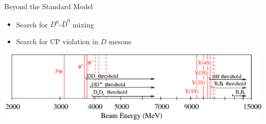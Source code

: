 \begin{slide*}
\begin{minipage}[t]{\linewidth}
\begin{itemize}
\end{itemize}

\vspace{0.5 cm}

{\huge Beyond the Standard Model}
\begin{itemize}

  \item Search for $D^0$-$\bar{D}^0$ mixing

  \item Search for CP violation in $D$ mesons

\end{itemize}

\vspace{1 cm}

\begin{center}
  \includegraphics[width=0.85\linewidth]{r_plot_bottom.eps}
\end{center}

\end{minipage}
\end{slide*}


